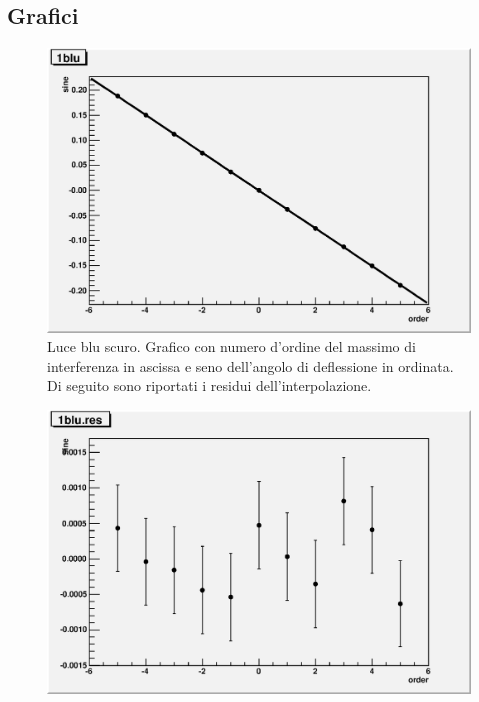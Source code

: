 \documentclass[italian,a4paper]{article}
\begin{document}
\subsection*{Grafici}
\begin{figure}[!h]\centering
\includegraphics[width=\textwidth]{1blu.eps}
\caption{Luce blu scuro. Grafico con numero d'ordine del massimo di interferenza in ascissa e seno dell'angolo di deflessione in ordinata. Di seguito sono riportati i residui dell'interpolazione.}\label{1blu}
\end{figure}
\begin{figure}[!h]\centering
\includegraphics[width=\textwidth]{1blu.res.eps}
\end{figure}
\end{document}
